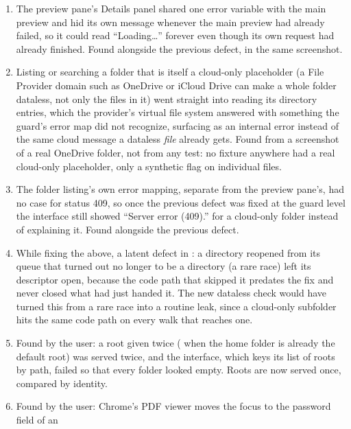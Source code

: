\begin{enumerate}
        Linux) that the guard's error map did not recognize, so it surfaced as an opaque
        500 instead of the same ``not found'' every other special file gets.  Found from a
        screenshot of the running application, not from any test.
  \item The preview pane's Details panel shared one error variable with the main preview
        and hid its own message whenever the main preview had already failed, so it could
        read ``Loading…'' forever even though its own request had already finished.  Found
        alongside the previous defect, in the same screenshot.
  \item Listing or searching a folder that is itself a cloud-only placeholder (a File
        Provider domain such as OneDrive or iCloud Drive can make a whole folder dataless,
        not only the files in it) went straight into reading its directory entries, which
        the provider's virtual file system answered with something the guard's error map
        did not recognize, surfacing as an internal error instead of the same cloud
        message a dataless \emph{file} already gets.  Found from a screenshot of a real
        OneDrive folder, not from any test: no fixture anywhere had a real cloud-only
        placeholder, only a synthetic flag on individual files.
  \item The folder listing's own error mapping, separate from the preview pane's, had no
        case for status 409, so once the previous defect was fixed at the guard level the
        interface still showed ``Server error (409).'' for a cloud-only folder instead of
        explaining it.  Found alongside the previous defect.
  \item While fixing the above, a latent defect in : a directory reopened
        from its queue that turned out no longer to be a directory (a rare race) left its
        descriptor open, because the code path that skipped it predates the fix and never
        closed what  had just handed it.  The new dataless check would have
        turned this from a rare race into a routine leak, since a cloud-only subfolder
        hits the same code path on every walk that reaches one.
  \item Found by the user: a root given twice ( when the home folder is
        already the default root) was served twice, and the interface, which keys its list of
        roots by path, failed so that every folder looked empty.  Roots are now served once,
        compared by identity.
  \item Found by the user: Chrome's PDF viewer moves the focus to the password field of an

\end{enumerate}
